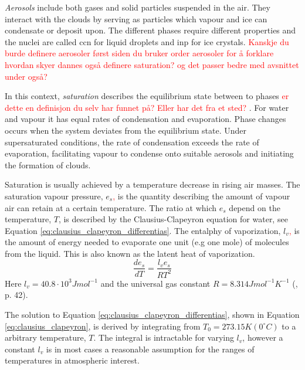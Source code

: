 \textit{Aerosols} include both gases and solid particles suspended in the air. They interact with the clouds by serving as particles which vapour and ice can condensate or deposit upon. The different phases require different properties and the nuclei are called \acrfull{ccn} for liquid droplets and \acrfull{inp} for ice crystals. 
\textcolor{red}{Kanskje du burde definere aerosoler først siden du bruker order aerosoler for å forklare hvordan skyer dannes også definere saturation? og det passer bedre med avsnittet under også?}



In this context, \textit{saturation} describes the equilibrium state between to phases \textcolor{red}{er dette en definisjon du selv har funnet på? Eller har det fra et sted? }. For water and vapour it has equal rates of condensation and evaporation. Phase changes occurs when the system deviates from the equilibrium state. Under supersaturated conditions, the rate of condensation exceeds the rate of evaporation, facilitating vapour to condense onto suitable aerosols and initiating the formation of clouds. 

Saturation is usually achieved by a temperature decrease in rising air masses. The saturation vapour pressure, $e_s$\textcolor{red}{,} is the quantity describing the amount of vapour air can retain at a certain temperature. The ratio at which $e_s$ depend on the temperature, $T$, is described by the Clausius-Clapeyron equation for water, see Equation \eqref{eq:clausius_clapeyron_differentias}. The entalphy of vaporization, $l_v$\textcolor{red}{,} is the amount of energy needed to evaporate one unit (e.g one mole) of molecules from the liquid. This is also known as the latent heat of vaporization. 
\begin{equation} \label{eq:clausius_clapeyron_differentias}
    \frac{de_s}{dT} = \frac{l_v e_s}{R T^2}
\end{equation}
Here $l_v = 40.8 \cdot 10^3 J mol^{-1}$ and the universal gas constant $R= 8.314 J mol^{-1} K^{-1}$ (\cite{cloud_phys_book_johanne}, p. 42). 

The solution to Equation \eqref{eq:clausius_clapeyron_differentias}, shown in Equation \eqref{eq:clausius_clapeyron}, is derived by integrating from $T_0 = 273.15K \left(0 ^{\circ}C \right)$ to a arbitrary temperature, $T$. The integral is intractable for varying $l_v$, however a constant $l_v$ is in most cases a reasonable assumption for the ranges of temperatures in atmospheric interest.

